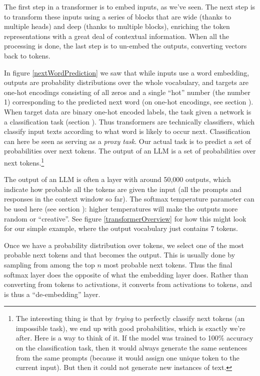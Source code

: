 The first step in a transformer is to embed inputs, as we've seen. The next
step is to transform these inputs using a series of blocks that are wide
(thanks to multiple heads) and deep (thanks to multiple blocks), enriching the token representations with a great deal of contextual information. When all the
processing is done, the last step is to un-embed the outputs, converting
vectors back to tokens. 

In figure \ref{nextWordPrediction} we saw that while inputs use a word
embedding, outputs are probability distributions over the whole vocabulary, and
targets are one-hot encodings consisting of all zeros and a single ``hot''
number (the number 1) corresponding to the predicted next word (on one-hot
encodings, see section ). When target data are binary one-hot
encoded labels, the task given a network is a classification task (section
). Thus transformers are technically
classifiers, which classify input texts according to what word is likely to
occur next. Classification can here be seen as serving as a \emph{proxy task}.
Our actual task is to predict a set of probabilities over next tokens. The
output of an LLM is a set of probabilities over next tokens.\footnote{The
interesting thing is that by \emph{trying} to perfectly classify next tokens
(an impossible task), we end up with good probabilities, which is exactly we're
after. Here is a way to think of it. If the model was trained to 100\% accuracy
on the classification task, then it would always generate the same sentences
from the same prompts (because it would assign one unique token to the current
input). But then it could not generate new instances of text.}

The output of an LLM is often a  layer with around 50,000
outputs, which  indicate how probable all the tokens are given the input (all
the prompts and responses in the context window so far). The softmax
temperature parameter can be used here (see section
): higher temperatures will make the outputs more
random or ``creative''. See figure \ref{transformerOverview} for how this might
look for our simple example, where the output vocabulary just contains 7
tokens. 

Once we have a probability distribution over tokens, we select one of the most
probable next tokens and that becomes the output. This is usually done by
sampling from among the top $n$ most probable next tokens. Thus the final
softmax layer does the opposite of what the embedding layer does. Rather than
converting from tokens to activations, it converts from activations to tokens,
and is thus a ``de-embedding'' layer.

